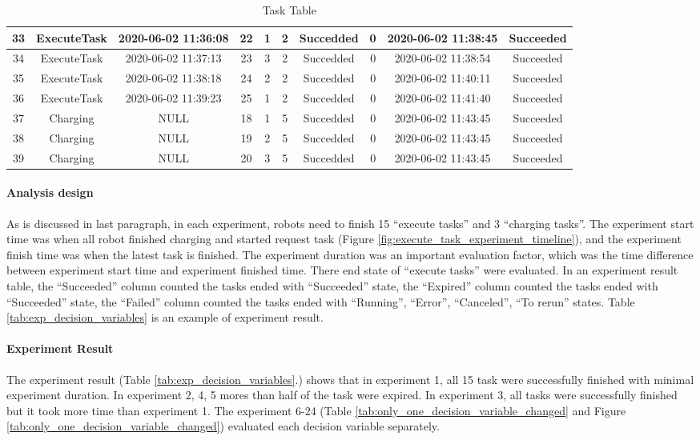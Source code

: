 \begin{table}[]
{\begin{tabular}{|c|c|c|c|c|c|c|c|c|c|}
33 & ExecuteTask & 2020-06-02 11:36:08 & 22 & 1 & 2 & Succedded & 0    & 2020-06-02 11:38:45 & Succeeded \\ \hline
34 & ExecuteTask & 2020-06-02 11:37:13 & 23 & 3 & 2 & Succedded & 0    & 2020-06-02 11:38:54 & Succeeded \\ \hline
35 & ExecuteTask & 2020-06-02 11:38:18 & 24 & 2 & 2 & Succedded & 0    & 2020-06-02 11:40:11 & Succeeded \\ \hline
36 & ExecuteTask & 2020-06-02 11:39:23 & 25 & 1 & 2 & Succedded & 0    & 2020-06-02 11:41:40 & Succeeded \\ \hline
37 & Charging    & NULL                & 18 & 1 & 5 & Succedded & 0 & 2020-06-02 11:43:45 & Succeeded \\ \hline
38 & Charging    & NULL                & 19 & 2 & 5 & Succedded & 0 & 2020-06-02 11:43:45 & Succeeded \\ \hline
39 & Charging    & NULL                & 20 & 3 & 5 & Succedded & 0 & 2020-06-02 11:43:45 & Succeeded \\ \hline
\end{tabular}}
\caption{Task Table}
\label{tab:exp_task_table}
\end{table}

\paragraph{Analysis design}
As is discussed in last paragraph, in each experiment, robots need to finish 15 ``execute tasks'' and 3 ``charging tasks''.
The experiment start time was when all robot finished charging and started request task (Figure \ref{fig:execute_task_experiment_timeline}), and the experiment finish time was when the latest task is finished.
The experiment duration was an important evaluation factor, which was the time difference between experiment start time and experiment finished time.  
There end state of ``execute tasks'' were evaluated. In an experiment result table, the ``Succeeded'' column counted the tasks ended with ``Succeeded'' state, the ``Expired'' column counted the tasks ended with ``Succeeded'' state, the ``Failed'' column counted the tasks ended with ``Running'', ``Error'', ``Canceled'', ``To rerun'' states. 
Table \ref{tab:exp_decision_variables} is an example of experiment result. 

\paragraph{Experiment Result} 
The experiment result (Table \ref{tab:exp_decision_variables}.) shows that in experiment 1, all 15 task were successfully finished with minimal experiment duration. In experiment 2, 4, 5 mores than half of the task were expired. In experiment 3, all tasks were successfully finished but it took more time than experiment 1. 
The experiment 6-24 (Table \ref{tab:only_one_decision_variable_changed} and Figure \ref{tab:only_one_decision_variable_changed}) evaluated each decision variable separately. 
